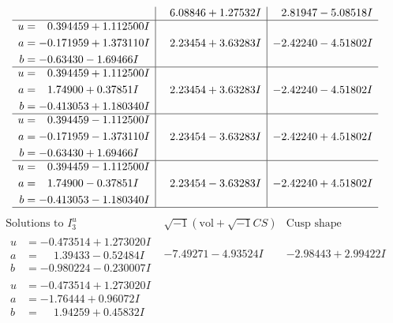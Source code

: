 \documentclass[1p]{elsarticle_modified}
\theoremstyle{definition}
\newcommand{\I}{\sqrt{-1}}
\begin{document}
$$\begin{array}{c|c|c}
 & \phantom{-}6.08846 + 1.27532 I & \phantom{-}2.81947 - 5.08518 I \\ \hline\begin{aligned}
u &= \phantom{-}0.394459 + 1.112500 I \\
a &= -0.171959 + 1.373110 I \\
b &= -0.63430 - 1.69466 I\end{aligned}
 & \phantom{-}2.23454 + 3.63283 I & -2.42240 - 4.51802 I \\ \hline\begin{aligned}
u &= \phantom{-}0.394459 + 1.112500 I \\
a &= \phantom{-}1.74900 + 0.37851 I \\
b &= -0.413053 + 1.180340 I\end{aligned}
 & \phantom{-}2.23454 + 3.63283 I & -2.42240 - 4.51802 I \\ \hline\begin{aligned}
u &= \phantom{-}0.394459 - 1.112500 I \\
a &= -0.171959 - 1.373110 I \\
b &= -0.63430 + 1.69466 I\end{aligned}
 & \phantom{-}2.23454 - 3.63283 I & -2.42240 + 4.51802 I \\ \hline\begin{aligned}
u &= \phantom{-}0.394459 - 1.112500 I \\
a &= \phantom{-}1.74900 - 0.37851 I \\
b &= -0.413053 - 1.180340 I\end{aligned}
 & \phantom{-}2.23454 - 3.63283 I & -2.42240 + 4.51802 I\\
 \hline 
 \end{array}$$\newpage$$\begin{array}{c|c|c}  
\text{Solutions to }I^u_{3}& \I (\text{vol} + \sqrt{-1}CS) & \text{Cusp shape}\\
 \hline 
\begin{aligned}
u &= -0.473514 + 1.273020 I \\
a &= \phantom{-}1.39433 - 0.52484 I \\
b &= -0.980224 - 0.230007 I\end{aligned}
 & -7.49271 - 4.93524 I & -2.98443 + 2.99422 I \\ \hline\begin{aligned}
u &= -0.473514 + 1.273020 I \\
a &= -1.76444 + 0.96072 I \\
b &= \phantom{-}1.94259 + 0.45832 I\end{aligned}

\end{array}$$
\end{document}
